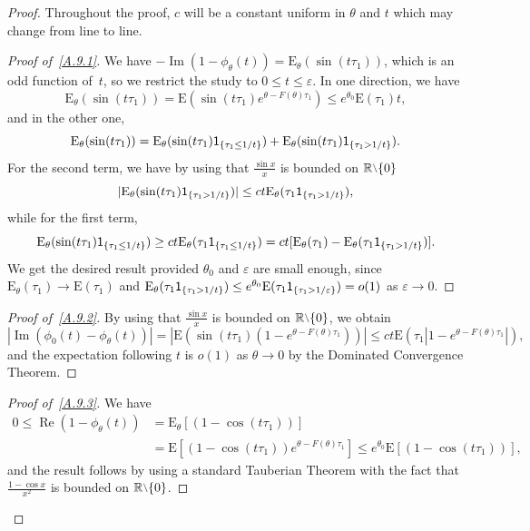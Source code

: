 \documentclass[AHL,Unicode,longabstracts]{cedram}
\DeclareMathOperator{\re}{Re}
\DeclareMathOperator{\im}{Im}
\newcommand{\bbR}{{\ensuremath{\mathbb R}}}
\newcommand{\gep}{\varepsilon}
\newcommand{\gt}{\theta}
\newcommand\bE{\ensuremath{\mathrm{E}}}
\newcommand{\ind}{{\sf 1}}
\newcommand{\sm}{{\raise0.3ex\hbox{$\scriptstyle \setminus$}}}
\newenvironment{step}[1]{\begin{proof}[#1]}{\let\qed\relax \end{proof}}
\begin{document}
\begin{proof}
Throughout the proof, $c$ will be a constant uniform in $\gt$ and $t$ which may change from line to line.

\begin{step}{Proof of~\eqref{A.9.1}}
We have $-\im(1- \phi_\gt(t)) = \bE_\gt (\sin(t\tau_1))$, which is an odd function of~$t$, so we restrict the study to $0\le t\le \gep$. In one direction, we have
\begin{equation}
\bE_\gt (\sin(t\tau_1)) = \bE(\sin(t\tau_1)e^{\gt - F(\gt)\tau_1}) \le e^{\gt_0}\bE(\tau_1) t,
\end{equation}
and in the other one,
\begin{equation}
\bE_\gt (\sin(t\tau_1)) = \bE_\gt (\sin(t\tau_1)\ind_{\{\tau_1 \le 1/t\}}) + \bE_\gt (\sin(t\tau_1)\ind_{\{\tau_1 > 1/t\}}).
\end{equation}
For the second term, we have by using that $\frac{\sin x}{x}$ is bounded on $\bbR\sm\{0\}$
\begin{equation}
|\bE_\gt (\sin(t\tau_1)\ind_{\{\tau_1 > 1/t\}})| \le ct\bE_\gt(\tau_1 \ind_{\{\tau_1 > 1/t\}}),
\end{equation}
while for the first term,
\begin{equation}
\bE_\gt (\sin(t\tau_1)\ind_{\{\tau_1 \le 1/t\}}) \ge ct \bE_\gt(\tau_1 \ind_{\{\tau_1 \le 1/t\}}) = ct [\bE_\gt(\tau_1) - \bE_\gt(\tau_1 \ind_{\{\tau_1 > 1/t\}})].
\end{equation}
We get the desired result provided $\gt_0$ and $\gep$ are small enough, since $\bE_\gt(\tau_1) \to \bE(\tau_1)$ and $\bE_\gt(\tau_1 \ind_{\{\tau_1 > 1/t\}}) \le e^{\gt_0} \bE(\tau_1 \ind_{\{\tau_1 > 1/\gep\}}) = o(1)$ as $\gep\to 0$.
\end{step}

\begin{step}{Proof of~\eqref{A.9.2}}
By using that $\frac{\sin x}{x}$ is bounded on $\bbR\sm\{0\}$, we obtain
\begin{equation}
|{\im(\phi_0(t) -\phi_\gt(t))}| = | \bE(\sin(t\tau_1) (1-e^{\gt - F(\gt)\tau_1})) | \le ct \bE(\tau_1|1-e^{\gt - F(\gt)\tau_1}|),
\end{equation} and the expectation following $t$ is $o(1)$ as $\gt\to 0$ by the Dominated Convergence Theorem.
\end{step}

\begin{step}{Proof of~\eqref{A.9.3}}
We have
\begin{equation}
\begin{aligned}
0 \le \re(1- \phi_\gt(t)) &= \bE_\gt[(1-\cos(t\tau_1))]\\
&= \bE[(1-\cos(t\tau_1))e^{\gt-F(\gt)\tau_1}] \le e^{\gt_0} \bE[(1-\cos(t\tau_1))],
\end{aligned}
\end{equation} and the result follows by using a standard Tauberian Theorem with the fact that $\frac{1-\cos x}{x^2}$ is bounded on $\bbR\sm\{0\}$.
\end{step}


\end{proof}
\end{document}
